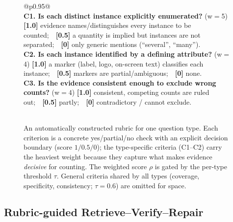 \documentclass[letterpaper]{article} %
\begin{document}
\begin{figure}[t]
\centering
\small
\setlength{\tabcolsep}{5pt}
\renewcommand{\arraystretch}{1.25}
\begin{tabular}{@{}p{}@{}}
\toprule
{} \\
\midrule
\textbf{C1. Is each distinct instance explicitly enumerated?} \hfill (w$=$5) \newline
\textbf{[1.0]} evidence names/distinguishes every instance to be counted;\ \
\textbf{[0.5]} a quantity is implied but instances are not separated;\ \
\textbf{[0]} only generic mentions (``several'', ``many''). \\
\textbf{C2. Is each instance identified by a defining attribute?} \hfill (w$=$4) \newline
\textbf{[1.0]} a marker (label, logo, on-screen text) classifies each instance;\ \
\textbf{[0.5]} markers are partial/ambiguous;\ \ \textbf{[0]} none. \\
\textbf{C3. Is the evidence consistent enough to exclude wrong counts?} \hfill (w$=$4) \newline
\textbf{[1.0]} consistent, competing counts are ruled out;\ \
\textbf{[0.5]} partly;\ \ \textbf{[0]} contradictory / cannot exclude. \\
\midrule
{} \\
\bottomrule
\end{tabular}
\caption{An automatically constructed rubric for one question type. Each criterion is a concrete yes/partial/no check with an explicit decision boundary (score $1/0.5/0$); the type-specific criteria (C1--C2) carry the heaviest weight because they capture what makes evidence \emph{decisive} for counting. The weighted score $\rho$ is gated by the per-type threshold $\tau$. General criteria shared by all types (coverage, specificity, consistency; $\tau\!=\!0.6$) are omitted for space.}
\label{fig:rubric_example}
\end{figure}

\subsection{Rubric-guided Retrieve--Verify--Repair}
\label{sec:loop}
\end{document}
